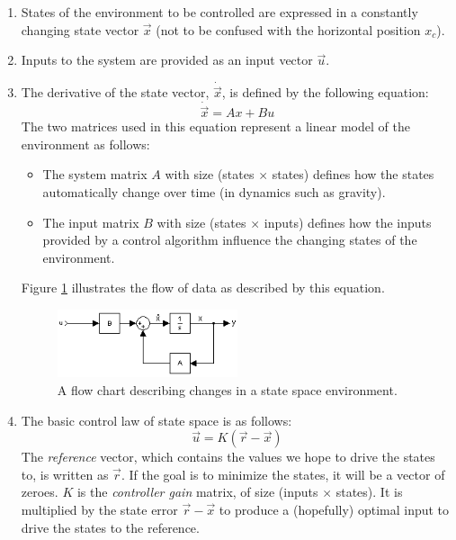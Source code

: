 \documentclass[11pt]{article}
\begin{document}
\begin{enumerate}
    \item States of the environment to be controlled are expressed in a constantly changing state vector $\vec{x}$ (not to be confused with the horizontal position $x _c$).
    \item Inputs to the system are provided as an input vector $\vec{u}$.
    \item The derivative of the state vector, $\dot{\vec{x}}$, is defined by the following equation:
        \begin{equation} \label{state_derivative}
            \dot{\vec{x}} = A x + B u
        \end{equation}
        The two matrices used in this equation represent a linear model of the environment as follows:
        \begin{itemize}
            \item The system matrix $A$ with size (states $\times$ states) defines how the states automatically change over time (in dynamics such as gravity).
            \item The input matrix $B$ with size (states $\times$ inputs) defines how the inputs provided by a control algorithm influence the changing states of the environment.
        \end{itemize}
        Figure \ref{state_space} illustrates the flow of data as described by this equation.
        \begin{figure}[ht]
            \centering
            \includegraphics[width=0.5\textwidth]{state_space}
            \caption{\label{state_space} A flow chart describing changes in a state space environment.}
        \end{figure}
    \item The basic control law of state space is as follows:
        \begin{equation} \label{control_law}
            \vec{u} = K(\vec{r} - \vec{x})
        \end{equation}
        The \textit{reference} vector, which contains the values we hope to drive the states to, is written as $\vec{r}$. If the goal is to minimize the states, it will be a vector of zeroes. $K$ is the \textit{controller gain} matrix, of size (inputs $\times$ states). It is multiplied by the state error $\vec{r} - \vec{x}$ to produce a (hopefully) optimal input to drive the states to the reference.
\end{enumerate}
\end{document}
